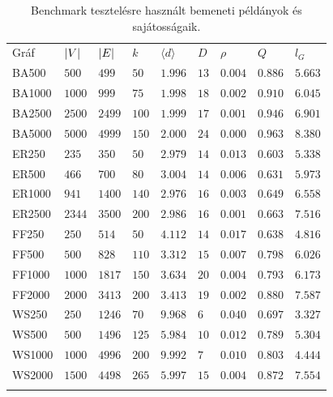 \begin{table}[b]
  \centering
  \caption{Benchmark tesztelésre használt bemeneti példányok és sajátosságaik.}\label{tab:BENCHMARK_INSTANCES}
  \begin{tabularx}{\textwidth} {
      >{\raggedright\arraybackslash}X
      >{\raggedleft\arraybackslash}X
      >{\raggedleft\arraybackslash}X
      >{\raggedleft\arraybackslash}X
      >{\raggedleft\arraybackslash}X
      >{\raggedleft\arraybackslash}X
      >{\raggedleft\arraybackslash}X
      >{\raggedleft\arraybackslash}X
      >{\raggedleft\arraybackslash}X
    }
    \Xhline{4\arrayrulewidth}
    Gráf   & $\lvert V\rvert$ & $\lvert E\rvert$ & $k$   & $\langle d \rangle$ & $D$  & $\rho$  & $Q$     & $l_G$   \\
    \Xhline{4\arrayrulewidth}
    BA500  & $500$     & $499$     & $50$  & $1.996$             & $13$ & $0.004$ & $0.886$ & $5.663$ \\
    BA1000 & $1000$    & $999$     & $75$  & $1.998$             & $18$ & $0.002$ & $0.910$ & $6.045$ \\
    BA2500 & $2500$    & $2499$    & $100$ & $1.999$             & $17$ & $0.001$ & $0.946$ & $6.901$ \\
    BA5000 & $5000$    & $4999$    & $150$ & $2.000$             & $24$ & $0.000$ & $0.963$ & $8.380$ \\
    \hline
    ER250  & $235$     & $350$     & $50$  & $2.979$             & $14$ & $0.013$ & $0.603$ & $5.338$ \\
    ER500  & $466$     & $700$     & $80$  & $3.004$             & $14$ & $0.006$ & $0.631$ & $5.973$ \\
    ER1000 & $941$     & $1400$    & $140$ & $2.976$             & $16$ & $0.003$ & $0.649$ & $6.558$ \\
    ER2500 & $2344$    & $3500$    & $200$ & $2.986$             & $16$ & $0.001$ & $0.663$ & $7.516$ \\
    \hline
    FF250  & $250$     & $514$     & $50$  & $4.112$             & $14$ & $0.017$ & $0.638$ & $4.816$ \\
    FF500  & $500$     & $828$     & $110$ & $3.312$             & $15$ & $0.007$ & $0.798$ & $6.026$ \\
    FF1000 & $1000$    & $1817$    & $150$ & $3.634$             & $20$ & $0.004$ & $0.793$ & $6.173$ \\
    FF2000 & $2000$    & $3413$    & $200$ & $3.413$             & $19$ & $0.002$ & $0.880$ & $7.587$ \\
    \hline
    WS250  & $250$     & $1246$    & $70$  & $9.968$             & $6$  & $0.040$ & $0.697$ & $3.327$ \\
    WS500  & $500$     & $1496$    & $125$ & $5.984$             & $10$ & $0.012$ & $0.789$ & $5.304$ \\
    WS1000 & $1000$    & $4996$    & $200$ & $9.992$             & $7$  & $0.010$ & $0.803$ & $4.444$ \\
    WS2000 & $1500$    & $4498$    & $265$ & $5.997$             & $15$ & $0.004$ & $0.872$ & $7.554$ \\
    \Xhline{4\arrayrulewidth}
  \end{tabularx}
\end{table}


